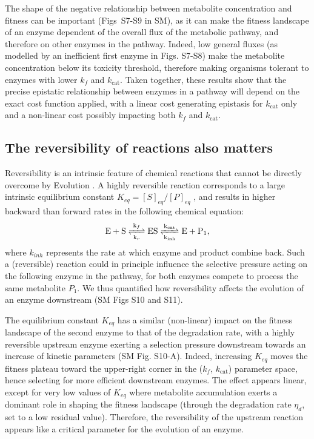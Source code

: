 \documentclass[11pt,onecolumn]{article}
\begin{document}
The shape of the negative relationship between metabolite concentration and fitness can be important (Figs~S7-S9 in SM), as it can make the fitness landscape of an enzyme dependent of the overall flux of the metabolic pathway, and therefore on other enzymes in the pathway. Indeed, low general fluxes (as modelled by an inefficient first enzyme in Figs. S7-S8) make the metabolite concentration below its toxicity threshold, therefore making organisms tolerant to enzymes with lower $k_f$ and $k_\text{cat}$. Taken together, these results show that the precise epistatic relationship between enzymes in a pathway will depend on the exact cost function applied, with a linear cost generating epistasis for $k_\text{cat}$ only and a non-linear cost possibly impacting both $k_f$ and $k_\text{cat}$. 
\subsection{The reversibility of reactions also matters}

Reversibility is an intrinsic feature of chemical reactions that cannot be directly overcome by Evolution \citep{Haldane30,Cornish-Bowden79a}. A highly reversible reaction corresponds to a large intrinsic equilibrium constant $K_{eq}=[S]_{eq}/[P]_{eq}$ \citep{Klipp94}, and results in higher backward than forward rates in the following chemical equation: \begin{equation}
\ce{ E + S <=>[k_{f}][k_{r}] ES <=>[k_{cat}][k_{inh}] E + P_1 },
\label{chemMM_fullrev}
\end{equation}
where $k_{inh}$ represents the rate at which enzyme and product combine back. Such a (reversible) reaction could in principle influence the selective pressure acting on the following enzyme in the pathway, for both enzymes compete to process the same metabolite $P_1$. We thus quantified how reversibility affects the evolution of an enzyme downstream (SM Figs S10 and S11). 

The equilibrium constant $K_{eq}$ has a similar (non-linear) impact on the fitness landscape of the second enzyme to that of the degradation rate, with a highly reversible upstream enzyme exerting a selection pressure downstream towards an increase of kinetic parameters (SM Fig. S10-A). Indeed, increasing $K_{eq}$ moves the fitness plateau toward the upper-right corner in the ($k_f$, $k_\text{cat}$) parameter space, hence selecting for more efficient downstream enzymes. The effect appears linear, except for very low values of $K_{eq}$ where metabolite accumulation exerts a dominant role in shaping the fitness landscape (through the degradation rate $\eta_d$, set to a low residual value). Therefore, the reversibility of the upstream reaction appears like a critical parameter for the evolution of an enzyme. 
\end{document}

